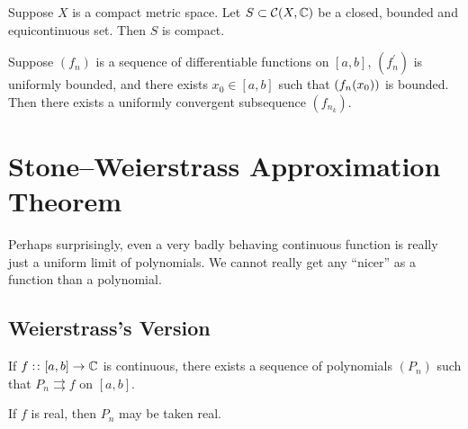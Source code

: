 \begin{corollary}
Suppose $X$ is a compact metric space. Let $S\subset\mathcal{C}(X,\mathbb C)$ be a closed, bounded and equicontinuous set. Then $S$ is compact.
\end{corollary}

\begin{corollary}
Suppose $(f_n)$ is a sequence of differentiable functions on $[a,b]$, $(f_n^\prime)$ is uniformly bounded, and there exists $x_0\in[a,b]$ such that $\left(f_n(x_0)\right)$ is bounded. Then there exists a uniformly convergent subsequence $(f_{n_k})$.
\end{corollary}
\pagebreak

\section{Stone--Weierstrass Approximation Theorem}
Perhaps surprisingly, even a very badly behaving continuous function is really just a uniform limit of polynomials. We cannot really get any ``nicer'' as a function than a polynomial.

\subsection{Weierstrass's Version}
\begin{theorem}
If $f:\colon[a,b]\to\mathbb C$ is continuous, there exists a sequence of polynomials $(P_n)$ such that $P_n\rightrightarrows f$ on $[a,b]$.

If $f$ is real, then $P_n$ may be taken real.
\end{theorem}

